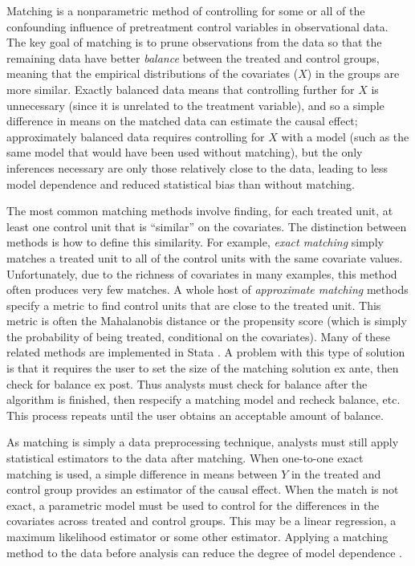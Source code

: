 \documentclass[11pt]{article}
\begin{document}
Matching is a nonparametric method of controlling for some or all of
the confounding influence of pretreatment control variables in
observational data.  The key goal of matching is to prune observations
from the data so that the remaining data have better \emph{balance}
between the treated and control groups, meaning that the empirical
distributions of the covariates ($X$) in the groups are more similar.
Exactly balanced data means that controlling further for $X$ is
unnecessary (since it is unrelated to the treatment variable), and so
a simple difference in means on the matched data can estimate the
causal effect; approximately balanced data requires controlling for
$X$ with a model (such as the same model that would have been used
without matching), but the only inferences necessary are only those
relatively close to the data, leading to less model dependence and
reduced statistical bias than without matching.

The most common matching methods involve finding, for each treated unit,
at least one control unit that is ``similar'' on the covariates.  The
distinction between methods is how to define this similarity. For example,
\emph{exact matching} simply matches a treated unit to all of the control
units with the same covariate values. Unfortunately, due to the richness
of covariates in many examples, this method often produces very few
matches. A whole host of \emph{approximate matching} methods specify a
metric to find control units that are close to the treated unit. This
metric is often the Mahalanobis distance or the propensity score (which is
simply the probability of being treated, conditional on the covariates).
Many of these related methods are implemented in Stata  \citep{SasIch02,
  AbaDruLeb02, LeuSia04, AbaDiaHai09}.  A problem with this type of solution is
that it requires the user to set the size of the matching solution ex
ante, then check for balance ex post. Thus analysts must check for balance
after the algorithm is finished, then respecify a matching model and
recheck balance, etc. This process repeats until the user obtains an
acceptable amount of balance.

As matching is simply a data preprocessing technique, analysts must still
apply statistical estimators to the data after matching. When one-to-one
exact matching is used, a simple difference in means between $Y$ in the
treated and control group provides an estimator of the causal effect. When
the match is not exact, a parametric model must be used to control for the
differences in the covariates across treated and control groups. This
may be a linear regression, a maximum likelihood estimator or some other
estimator. Applying a matching method to the data before analysis can
reduce the degree of model dependence \citep{HoImaKin07}. 
\end{document}
